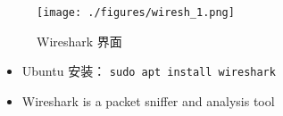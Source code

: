 
\begin{issues}
\issueDraft
\end{issues}

\begin{figure}[ht]
\centering
\texttt{[image: ./figures/wiresh\_1.png]}
\caption{Wireshark 界面} \label{wiresh_fig1}
\end{figure}

\begin{itemize}
\item Ubuntu 安装： \verb|sudo apt install wireshark|
\item Wireshark is a packet sniffer and analysis tool
\end{itemize}
